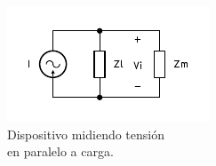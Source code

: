 \begin{figure}[H]
    \centering
    \includegraphics[width=\columnwidth]{img/circ/vmeas.pdf}
    \caption{Dispositivo midiendo tensión \\en paralelo a carga.}
    \label{fig:vmeas}
\end{figure}